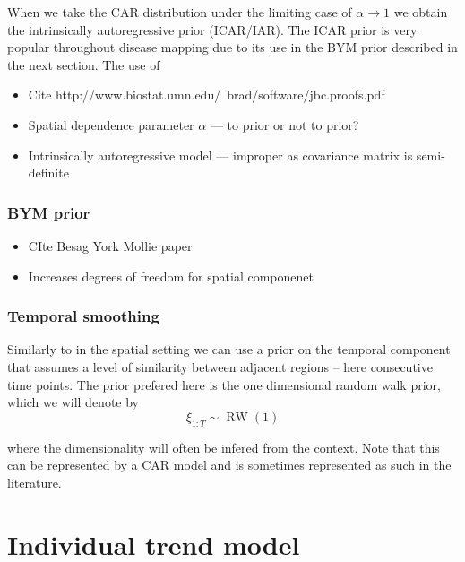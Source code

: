 \documentclass[11pt]{report}
\begin{document}
When we take the CAR distribution under the limiting case of $\alpha \to 1$ we obtain the intrinsically autoregressive prior (ICAR/IAR). The ICAR prior is very popular throughout disease mapping due to its use in the BYM prior described in the next section. The use of  


\begin{itemize}

\item Cite http://www.biostat.umn.edu/~brad/software/jbc.proofs.pdf


\item Spatial dependence parameter $\alpha$ --- to prior or not to prior?

\item Intrinsically autoregressive model --- improper as covariance matrix is semi-definite

\end{itemize}

\subsection{BYM prior}

\begin{itemize}
\item CIte Besag York Mollie paper
\item Increases degrees of freedom for spatial componenet
\end{itemize}

\subsection{Temporal smoothing}

Similarly to in the spatial setting we can use a prior on the temporal component that assumes a level of similarity between adjacent regions -- here consecutive time points. The prior prefered here is the one dimensional random walk prior, which we will denote by
\begin{equation}
\xi_{1:T} \sim \operatorname{RW}(1)
\end{equation}

where the dimensionality will often be infered from the context. Note that this can be represented by a CAR model and is sometimes represented as such in the literature. 

\chapter{Individual trend model}
\end{document}
